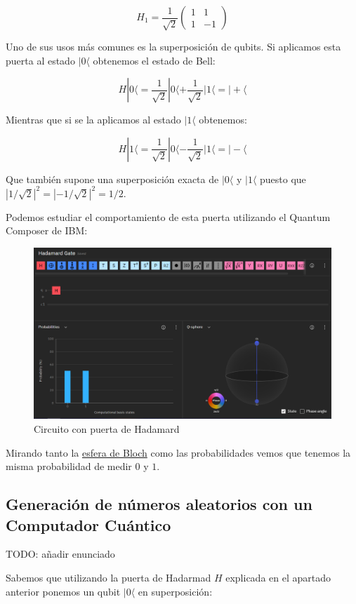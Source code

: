 \documentclass[11pt]{article}
\newcommand{\la}{\langle}
\begin{document}
\[
	H_1 = \frac{1}{\sqrt 2}
	\begin{pmatrix}
		1 & 1 \\
		1 & -1 
	\end{pmatrix}
\]

Uno de sus usos más comunes es la superposición de qubits. Si aplicamos esta puerta al estado $|0\la$ obtenemos el estado de Bell:

\[
	H|0\la = \frac{1}{\sqrt 2} |0\la + \frac{1}{\sqrt 2} |1\la = |+\la
\]

Mientras que si se la aplicamos al estado $|1\la$ obtenemos:

\[
	H|1\la = \frac{1}{\sqrt 2} |0\la - \frac{1}{\sqrt 2} |1\la = |-\la
\]

Que también supone una superposición exacta de $|0\la$ y $|1\la$ puesto que $|1/\sqrt 2|^2 = |-1/\sqrt 2|^2 = 1/2$.

Podemos estudiar el comportamiento de esta puerta utilizando el Quantum Composer de IBM:

\begin{figure}[H]
	\centering
	\includegraphics[scale=0.8]{figures/gate-hadamard.png}
	\caption{Circuito con puerta de Hadamard}
\end{figure}

Mirando tanto la \href{URL}{esfera de Bloch} como las probabilidades vemos que tenemos la misma probabilidad de medir $0$ y $1$.

\subsection{Generación de números aleatorios con un Computador Cuántico}

TODO: añadir enunciado

Sabemos que utilizando la puerta de Hadarmad $H$ explicada en el apartado anterior ponemos un qubit $|0\la$ en superposición:
\end{document}
